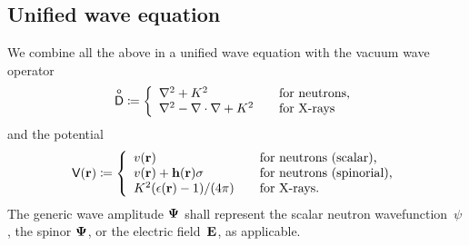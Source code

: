 %
%
%

%
%

\subsection{Unified wave equation}\label{SuniWave}

We combine all the above in a unified wave equation
%
with the vacuum wave operator
%
%
\begin{equation}\label{EDo}
  \mathsf{\overset{o}{D}} \coloneqq \left\{ \begin{array}{ll}
      \mathbf{\nabla}^2 + K^2                     &\text{~~~for neutrons,}\\
      \mathbf{\nabla}^2 - \mathbf{\nabla}\cdot\mathbf{\nabla} + K^2 &\text{~~~for X-rays}
  \end{array}\right.
\end{equation}
%
and the potential
%
%
\begin{equation}\label{ETV}
  \mathsf{V}(\mathbf{r}) \coloneqq \left\{ \begin{array}{ll}
      v(\mathbf{r})                         &\text{~~~for neutrons (scalar),}\\
      v(\mathbf{r})+\mathbf{h}(\mathbf{r})\mathbf{\sigma}       &\text{~~~for neutrons (spinorial),}\\
      K^2(\epsilon(\mathbf{r})-1)/(4\pi) &\text{~~~for X-rays.}
  \end{array}\right.
\end{equation}
The generic wave amplitude $\mathbf{\Psi}$
%
shall represent
the scalar neutron wavefunction~$\psi$,
the spinor $\mathbf{\Psi}$, or the electric field~$\mathbf{E}$, as applicable.


